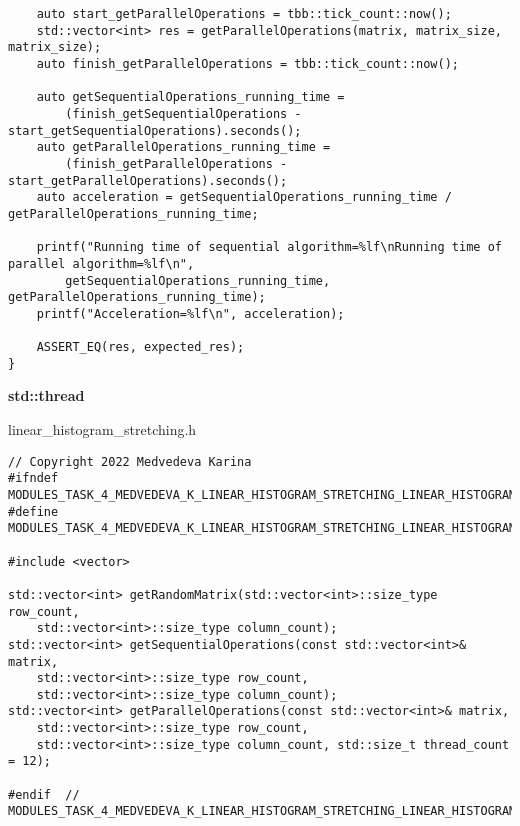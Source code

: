 \documentclass{report}
\begin{document}
\begin{lstlisting}
    auto start_getParallelOperations = tbb::tick_count::now();
    std::vector<int> res = getParallelOperations(matrix, matrix_size, matrix_size);
    auto finish_getParallelOperations = tbb::tick_count::now();

    auto getSequentialOperations_running_time =
        (finish_getSequentialOperations - start_getSequentialOperations).seconds();
    auto getParallelOperations_running_time =
        (finish_getParallelOperations - start_getParallelOperations).seconds();
    auto acceleration = getSequentialOperations_running_time / getParallelOperations_running_time;

    printf("Running time of sequential algorithm=%lf\nRunning time of parallel algorithm=%lf\n",
        getSequentialOperations_running_time, getParallelOperations_running_time);
    printf("Acceleration=%lf\n", acceleration);

    ASSERT_EQ(res, expected_res);
}
\end{lstlisting}

\textbf{std::thread}
\par linear\_histogram\_stretching.h
\begin{lstlisting}
// Copyright 2022 Medvedeva Karina
#ifndef MODULES_TASK_4_MEDVEDEVA_K_LINEAR_HISTOGRAM_STRETCHING_LINEAR_HISTOGRAM_STRETCHING_H_
#define MODULES_TASK_4_MEDVEDEVA_K_LINEAR_HISTOGRAM_STRETCHING_LINEAR_HISTOGRAM_STRETCHING_H_

#include <vector>

std::vector<int> getRandomMatrix(std::vector<int>::size_type row_count,
    std::vector<int>::size_type column_count);
std::vector<int> getSequentialOperations(const std::vector<int>& matrix,
    std::vector<int>::size_type row_count,
    std::vector<int>::size_type column_count);
std::vector<int> getParallelOperations(const std::vector<int>& matrix,
    std::vector<int>::size_type row_count,
    std::vector<int>::size_type column_count, std::size_t thread_count = 12);

#endif  // MODULES_TASK_4_MEDVEDEVA_K_LINEAR_HISTOGRAM_STRETCHING_LINEAR_HISTOGRAM_STRETCHING_H_
\end{lstlisting}
\end{document}

